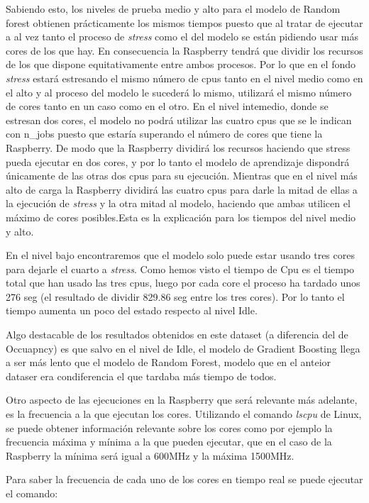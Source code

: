 \documentclass[a4paper, 12pt]{book}
\begin{document}
Sabiendo esto, los niveles de prueba medio y alto para el modelo de Random forest obtienen prácticamente los mismos tiempos puesto que al tratar de ejecutar a al vez tanto el proceso de \textit{stress} como el del modelo se están pidiendo usar más cores de los que hay. En consecuencia la Raspberry tendrá que dividir los recursos de los que dispone equitativamente entre ambos procesos. Por lo que en el fondo \textit{stress} estará estresando el mismo número de cpus tanto en el nivel medio como en el alto y al proceso del modelo le sucederá lo mismo, utilizará el mismo número de cores tanto en un caso como en el otro. En el nivel intemedio, donde se estresan dos cores, el modelo no podrá utilizar las cuatro cpus que se le indican con n\_jobs puesto que estaría superando el número de cores que tiene la Raspberry. De modo que la Raspberry dividirá los recursos haciendo que stress pueda ejecutar en dos cores, y por lo tanto el modelo de aprendizaje dispondrá únicamente de las otras dos cpus para su ejecución. Mientras que en el nivel más alto de carga la Raspberry dividirá las cuatro cpus para darle la mitad de ellas a la ejecución de \textit{stress} y la otra mitad al modelo, haciendo que ambas utilicen el máximo de cores posibles.Esta es la explicación para los tiempos del nivel medio y alto. 

En el nivel bajo encontraremos que el modelo solo puede estar usando tres cores para dejarle el cuarto a \textit{stress}. Como hemos visto el tiempo de Cpu es el tiempo total que han usado las tres cpus, luego por cada core el proceso ha tardado unos 276 seg (el resultado de dividir 829.86 seg entre los tres cores). Por lo tanto el tiempo aumenta un poco del estado respecto al nivel Idle.

Algo destacable de los resultados obtenidos en este dataset (a diferencia del de Occuapncy) es que salvo en el nivel de Idle, el modelo de Gradient Boosting llega a ser más lento que el modelo de Random Forest, modelo que en el anteior dataser era condiferencia el que tardaba más tiempo de todos.

Otro aspecto de las ejecuciones en la Raspberry  que será relevante más adelante, es la frecuencia a la que ejecutan los cores. Utilizando el comando \textit{lscpu} de Linux, se puede obtener información relevante sobre los cores como por ejemplo la frecuencia máxima y mínima a la que pueden ejecutar, que en el caso de la Raspberry la mínima será igual a 600MHz y la máxima 1500MHz. 

Para saber la frecuencia de cada uno de los cores en tiempo real se puede ejecutar el comando:\\
\end{document}
